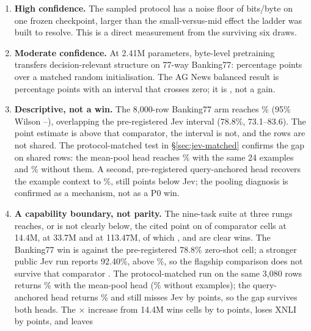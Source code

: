 \begin{enumerate}
  \item \textbf{High confidence.} The sampled protocol has a noise floor of
  \ProtoOldSpread{} bits/byte on one frozen checkpoint, larger than the
  small-versus-mid effect the ladder was built to resolve. This is a direct
  measurement from the surviving six draws.
  \item \textbf{Moderate confidence.} At 2.41M parameters, byte-level pretraining
  transfers decision-relevant structure on 77-way Banking77:
  \TransferBankGain{} percentage points over a matched random initialisation. The
  AG News balanced result is \TransferAgGain{} percentage points with an interval
  that crosses zero; it is \TransferAgVerdict, not a gain.
  \item \textbf{Descriptive, not a win.} The 8,000-row Banking77 arm reaches
  \ShipAcc\% (95\% Wilson \ShipLo--\ShipHi), overlapping the pre-registered Jev
  interval (78.8\%, 73.1--83.6). The point estimate is above that comparator,
  the interval is not, and the rows are not shared. The protocol-matched test in
  \S\ref{sec:jev-matched} confirms the gap on shared rows: the mean-pool head
  reaches \JevMatchPctAOne\% with the same 24 examples and \JevMatchPctNoEx\%
  without them. A second, pre-registered query-anchored head recovers the
  example context to \QueryPctQueryTwo\%, still \QueryDiffAbs{} points below
  Jev; the pooling diagnosis is confirmed as a mechanism, not as a P0 win.
  \item \textbf{A capability boundary, not parity.} The nine-task suite at three
  rungs reaches, or is not clearly below, the cited point on
  \SuiteSmallAtOrAboveThree{} of \SuiteComparatorCells{} comparator cells at
  14.4M, \SuiteMidAtOrAboveThree{} at 33.7M and \SuiteLargeAtOrAbove{} at
  113.47M, of which \SuiteSmallClear, \SuiteMidClear{} and \SuiteLargeClear{} are
  clear wins. The Banking77 win is against the pre-registered 78.8\% zero-shot
  cell; a stronger public Jev run reports 92.40\%, above \SuiteLargeBank\%, so the
  flagship comparison does not survive that comparator \citep{smith2026jevbanking}.
  The protocol-matched run on the same 3,080 rows returns \JevMatchPctAOne\%
  with the mean-pool head (\JevMatchPctNoEx\% without examples); the
  query-anchored head returns \QueryPctQueryTwo\% and still misses Jev by
  \QueryDiffAbs{} points, so the gap survives both heads.
  The \SuiteLargeParamsRatio$\times$ increase from 14.4M wins
  \SuiteLargeWins{} cells by \SuiteLargeWinMin{} to \SuiteLargeWinMax{} points,
  loses XNLI by \SuiteLargeLossAbs{} points, and leaves \SuiteLargeUnmoved{}

\end{enumerate}
